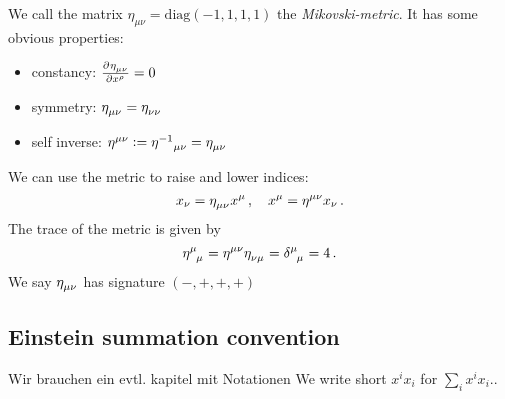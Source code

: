 We call the matrix $\eta_{\mu\nu}=\mathrm{diag}(-1,1,1,1)$ the
\emph{Mikovski-metric}. It has some obvious properties:
\begin{itemize}
  \item constancy: $\pd{\tensor{\eta}{_\mu_\nu}}{{x^\rho}}=0$
  \item symmetry: $\tensor{\eta}{_\mu_\nu}=\tensor{\eta}{_\nu_\nu}$
  \item self inverse:
  $\tensor{\eta}{^\mu^\nu}:=\tensor{{\eta^{-1}}}{_\mu_\nu}=\tensor{\eta}{_\mu_\nu}$
\end{itemize}
We can use the metric to raise and lower indices:
\begin{equation}
x_\nu=\tensor{\eta}{_\mu_\nu}x^\mu\, ,\quad x^\mu=\tensor{\eta}{^\mu^\nu}x_\nu\,
.
\end{equation}
The trace of the metric is given by
\begin{equation}
\tensor{\eta}{^\mu_\mu}=\tensor{\eta}{^\mu^\nu}\tensor{\eta}{_\nu_\mu}
=\tensor{\delta}{^\mu_\mu}=4\, .
\end{equation}
We say $\tensor{\eta}{_\mu_\nu}$ has signature $(-,+,+,+)$
\subsection{Einstein summation convention}
Wir brauchen ein evtl. kapitel mit Notationen 
We write short $x^ix_i$ for $\sum_i x^ix_i$..

